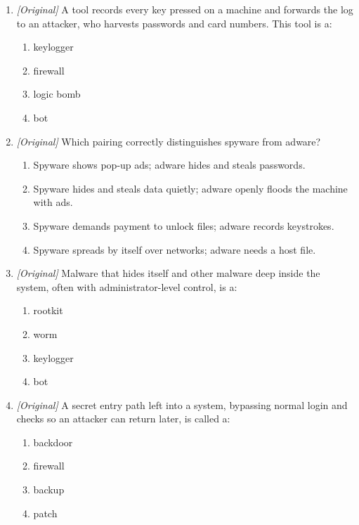 \begin{enumerate}[label=\textbf{Q\arabic*.}, leftmargin=*]
\begin{enumerate}[label=\Alph*.]
    \item spyware
    \item adware
    \item rootkit
    \item backdoor
  \end{enumerate}
\item \textit{[Original]} A tool records every key pressed on a machine and
  forwards the log to an attacker, who harvests passwords and card numbers.
  This tool is a:
  \begin{enumerate}[label=\Alph*.]
    \item keylogger
    \item firewall
    \item logic bomb
    \item bot
  \end{enumerate}
\item \textit{[Original]} Which pairing correctly distinguishes spyware from
  adware?
  \begin{enumerate}[label=\Alph*.]
    \item Spyware shows pop-up ads; adware hides and steals passwords.
    \item Spyware hides and steals data quietly; adware openly floods the
      machine with ads.
    \item Spyware demands payment to unlock files; adware records
      keystrokes.
    \item Spyware spreads by itself over networks; adware needs a host file.
  \end{enumerate}
\item \textit{[Original]} Malware that hides itself and other malware deep
  inside the system, often with administrator-level control, is a:
  \begin{enumerate}[label=\Alph*.]
    \item rootkit
    \item worm
    \item keylogger
    \item bot
  \end{enumerate}
\item \textit{[Original]} A secret entry path left into a system, bypassing
  normal login and checks so an attacker can return later, is called a:
  \begin{enumerate}[label=\Alph*.]
    \item backdoor
    \item firewall
    \item backup
    \item patch

\end{enumerate}
\end{enumerate}
